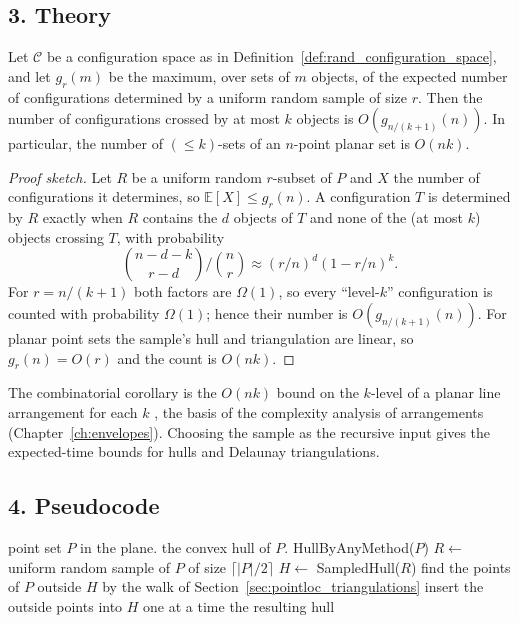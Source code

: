\subsection{3. Theory}

\begin{theorem}\label{thm:rand_clarkson_shor}
  Let $\mathcal{C}$ be a configuration space as in
  Definition~\ref{def:rand_configuration_space}, and let $g_r(m)$ be the
  maximum, over sets of $m$ objects, of the expected number of configurations
  determined by a uniform random sample of size $r$. Then the number of
  configurations crossed by at most $k$ objects is $O(g_{n/(k+1)}(n))$. In
  particular, the number of $(\le k)$-sets of an $n$-point planar set is
  $O(nk)$.
\end{theorem}

\begin{proof}[Proof sketch]
  Let $R$ be a uniform random $r$-subset of $P$ and $X$ the number of
  configurations it determines, so $\mathbb{E}[X] \le g_r(n)$. A configuration
  $T$ is determined by $R$ exactly when $R$ contains the $d$ objects of $T$ and
  none of the (at most $k$) objects crossing $T$, with probability
  \[
    \binom{n-d-k}{r-d} \Big/ \binom{n}{r} \approx (r/n)^d (1 - r/n)^k.
  \]
  For $r = n/(k+1)$ both factors are $\Omega(1)$, so every ``level-$k$''
  configuration is counted with probability $\Omega(1)$; hence their number is
  $O(g_{n/(k+1)}(n))$. For planar point sets the sample's hull and
  triangulation are linear, so $g_r(n) = O(r)$ and the count is $O(nk)$.
\end{proof}

The combinatorial corollary is the $O(nk)$ bound on the $k$-level of a planar
line arrangement for each $k$ \cite{clarkson1989}, the basis of the complexity
analysis of arrangements (Chapter~\ref{ch:envelopes}). Choosing the sample as
the recursive input gives the expected-time bounds for hulls and Delaunay
triangulations.

\subsection{4. Pseudocode}

\begin{algorithm}[htbp]
\caption{Clarkson--Shor Sampling for Convex Hulls}
\label{alg:rand_clarkson_shor_hull}
\begin{algorithmic}[1]
\Require point set $P$ in the plane.
\Ensure the convex hull of $P$.
   \State \Return HullByAnyMethod($P$) \EndIf
  \State $R \gets$ uniform random sample of $P$ of size $\lceil |P|/2 \rceil$
  \State $H \gets$ SampledHull($R$)
  \State find the points of $P$ outside $H$ by the walk of Section~\ref{sec:pointloc_triangulations}
  \State insert the outside points into $H$ one at a time
  \State \Return the resulting hull
\EndFunction
\end{algorithmic}
\end{algorithm}

